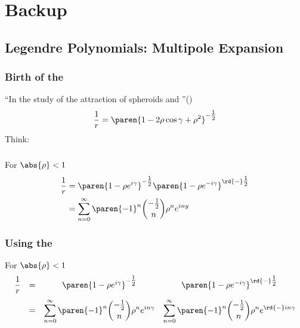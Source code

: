 % 

\section{Backup}

\subsection{Legendre Polynomials: Multipole Expansion}
\begin{frame}\frametitle{Birth of the \legendremathworld}
``In the study of the attraction of spheroids and ''(\cite[ch. 3, p. 169]{sansone1959orthogonal})\\
%
\begin{equation}
	\frac{1}{r} = \paren{1 - 2\rho \cos \gamma + \rho^{2}}^{-\tfrac{1}{2}}
\label{eq:leg-start}
\end{equation}
\pause
Think: \LawOfCosinesMathworld {}
\end{frame}

\begin{frame}\frametitle{\binomialSeriesMathworld}
For $\abs{\rho} < 1$
\begin{equation}
	\begin{split}
		\frac{1}{r} &= \paren{1 - \rho e^{i\gamma}}^{-\tfrac{1}{2}} \paren{1 - \rho e^{-i\gamma}}^{\rd{-}\tfrac{1}{2}} \\
			&= \sum_{n=0}^{\infty}\paren{-1}^{n} \binom{-\tfrac{1}{2}}{n} \rho^{n} e^{iny}
	\end{split}
\label{eq:expand 1/r}
\end{equation}
\end{frame}

\begin{frame}\frametitle{Using the \ \binomialSeriesMathworld}
For $\abs{\rho} < 1$
\begin{equation}
\begin{array}{cccc}
		\displaystyle\frac{1}{r} &=& \paren{1 - \rho e^{i\gamma}}^{-\tfrac{1}{2}} & \paren{1 - \rho e^{-i\gamma}}^{\rd{-}\tfrac{1}{2}} \\[10pt]
			&=& \displaystyle\sum_{n=0}^{\infty}\paren{-1}^{n} \binom{-\tfrac{1}{2}}{n} \rho^{n} e^{in\gamma}
			& \displaystyle\sum_{n=0}^{\infty}\paren{-1}^{n} \binom{-\tfrac{1}{2}}{n} \rho^{n} e^{\rd{-}in\gamma}
\end{array}
\label{eq:expand 1/r}
\end{equation}
\end{frame}

